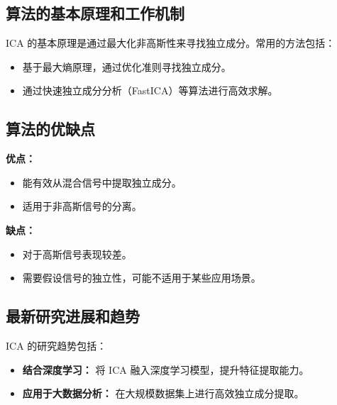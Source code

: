\subsection*{算法的基本原理和工作机制}
ICA 的基本原理是通过最大化非高斯性来寻找独立成分。常用的方法包括：
\begin{itemize}
    \item 基于最大熵原理，通过优化准则寻找独立成分。
    \item 通过快速独立成分分析（FastICA）等算法进行高效求解。
\end{itemize}

\subsection*{算法的优缺点}
\textbf{优点：}
\begin{itemize}
    \item 能有效从混合信号中提取独立成分。
    \item 适用于非高斯信号的分离。
\end{itemize}

\textbf{缺点：}
\begin{itemize}
    \item 对于高斯信号表现较差。
    \item 需要假设信号的独立性，可能不适用于某些应用场景。
\end{itemize}

\subsection*{最新研究进展和趋势}
ICA 的研究趋势包括：
\begin{itemize}
    \item \textbf{结合深度学习：} 将 ICA 融入深度学习模型，提升特征提取能力。
    \item \textbf{应用于大数据分析：} 在大规模数据集上进行高效独立成分提取。
\end{itemize}
